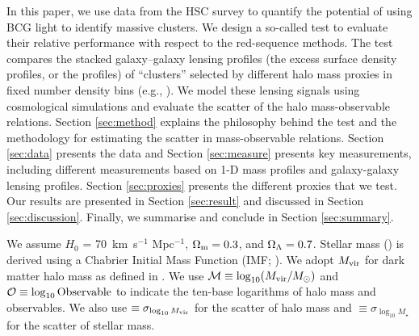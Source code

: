 \documentclass[fleqn,usenatbib,useAMS]{mnras}
\begin{document}
\begin{CJK*}{UTF8}{gbsn}
    In this paper, we use data from the HSC survey to quantify the potential of using BCG light to
    identify massive clusters. 
    We design a so-called \topn{} test to evaluate their relative performance with respect to the
    red-sequence methods. 
    The \topn{} test compares the stacked galaxy--galaxy lensing profiles (the excess surface
    density profiles, or the \dsigma{} profiles) of ``clusters'' selected by different halo mass
    proxies in fixed number density bins (e.g., \citealt{Reyes2008}). 
    We model these lensing signals using cosmological simulations and evaluate the scatter of the
    halo mass-observable relations.  
    Section \ref{sec:method} explains the philosophy behind the \topn{} test and the methodology 
    for estimating the scatter in mass-observable relations. 
    Section \ref{sec:data} presents the data and Section \ref{sec:measure} presents key
    measurements, including different \mstar{} measurements based on 1-D mass profiles and
    galaxy-galaxy lensing profiles. 
    Section \ref{sec:proxies} presents the different proxies that we test. 
    Our results are presented in Section \ref{sec:result} and discussed in Section
    \ref{sec:discussion}. 
    Finally, we summarise and conclude in Section \ref{sec:summary}.
    

    We assume $H_0$ = 70~km~s$^{-1}$ Mpc$^{-1}$, ${\Omega}_{\rm m}=0.3$, and ${\Omega}_{\rm
    \Lambda}=0.7$.
    Stellar mass (\mstar{}) is derived using a Chabrier Initial Mass Function (IMF;
    \citealt{Chabrier2003}).
    We adopt $M_{\rm vir}$ for dark matter halo mass as defined in \citealt{BryanNorman1998}.
    We use $\mathcal{M}\equiv \log_{10} (M_{\rm vir}/M_{\odot})$ and 
    $\mathcal{O}\equiv \log_{10} \rm Observable$ to indicate the ten-base logarithms of
    halo mass and observables.
    We also use \sigmvir{}$\equiv \sigma_{\log_{10} M_{\rm vir}}$ for the scatter of 
    halo mass and \sigms{}$\equiv \sigma_{\log_{10} M_{\star}}$ for the scatter of stellar mass. 
    

\end{CJK*}
\end{document}
